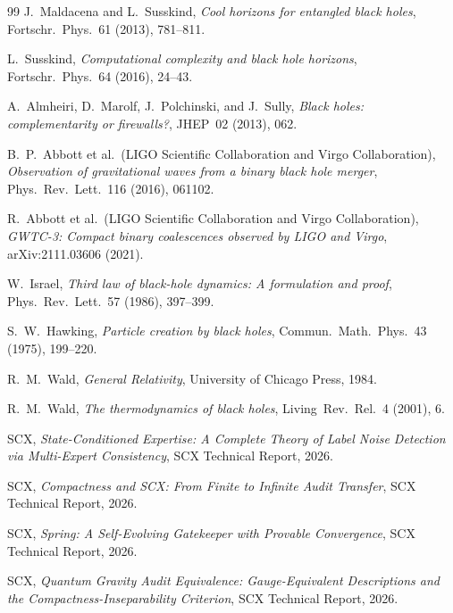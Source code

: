 \documentclass[12pt,a4paper]{article}
\theoremstyle{remark}
\begin{document}
\begin{thebibliography}{99}
J.~Maldacena and L.~Susskind,
\emph{Cool horizons for entangled black holes},
Fortschr.~Phys.~61 (2013), 781--811.

L.~Susskind,
\emph{Computational complexity and black hole horizons},
Fortschr.~Phys.~64 (2016), 24--43.

A.~Almheiri, D.~Marolf, J.~Polchinski, and J.~Sully,
\emph{Black holes: complementarity or firewalls?},
JHEP~02 (2013), 062.

B.~P.~Abbott et al.~(LIGO Scientific Collaboration and Virgo Collaboration),
\emph{Observation of gravitational waves from a binary black hole merger},
Phys.~Rev.~Lett.~116 (2016), 061102.

R.~Abbott et al.~(LIGO Scientific Collaboration and Virgo Collaboration),
\emph{GWTC-3: Compact binary coalescences observed by LIGO and Virgo},
arXiv:2111.03606 (2021).

W.~Israel,
\emph{Third law of black-hole dynamics: A formulation and proof},
Phys.~Rev.~Lett.~57 (1986), 397--399.

S.~W.~Hawking,
\emph{Particle creation by black holes},
Commun.~Math.~Phys.~43 (1975), 199--220.

R.~M.~Wald,
\emph{General Relativity},
University of Chicago Press, 1984.

R.~M.~Wald,
\emph{The thermodynamics of black holes},
Living~Rev.~Rel.~4 (2001), 6.

SCX,
\emph{State-Conditioned Expertise: A Complete Theory of Label Noise Detection via Multi-Expert Consistency},
SCX Technical Report, 2026.

SCX,
\emph{Compactness and SCX: From Finite to Infinite Audit Transfer},
SCX Technical Report, 2026.

SCX,
\emph{Spring: A Self-Evolving Gatekeeper with Provable Convergence},
SCX Technical Report, 2026.

SCX,
\emph{Quantum Gravity Audit Equivalence: Gauge-Equivalent Descriptions and the Compactness-Inseparability Criterion},
SCX Technical Report, 2026.

\end{thebibliography}
\end{document}
